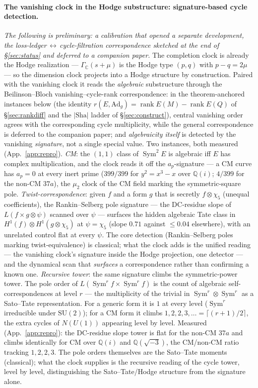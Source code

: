 \documentclass[11pt]{article}
\theoremstyle{definition}
\newcommand{\Sym}{\operatorname{Sym}}
\newcommand{\Sha}{\mathrm{Sha}}
\begin{document}
\paragraph{The vanishing clock in the Hodge substructure: signature-based cycle detection.}
\emph{The following is preliminary: a calibration that opened a separate development, the
loss-ledger$\,\leftrightarrow\,$cycle-filtration correspondence sketched at the end of \S\ref{sec:status}
and deferred to a companion paper.} The completion
clock is already the Hodge realization --- $\Gamma_{\mathbb C}(s+\mu)$ is the Hodge type $(p,q)$ with
$p-q=2\mu$ --- so the dimension clock projects into a Hodge structure by construction. Paired with the
vanishing clock it reads the \emph{algebraic} substructure through the Beilinson--Bloch
vanishing--cycle-rank correspondence: in the theorem-anchored instances below (the identity
$r(E,\mathrm{Ad}_g)=\operatorname{rank}E(M)-\operatorname{rank}E(Q)$ of \S\ref{sec:rankdiff} and the
$|\Sha|$ ladder of \S\ref{sec:construct}), central vanishing order agrees with the corresponding cycle
multiplicity, while the general correspondence is deferred to the companion paper; and
\emph{algebraicity itself} is detected by the vanishing \emph{signature}, not a single special value. Two
instances, both measured (App.~\ref{app:repro}). \emph{CM}: the $(1,1)$ class of $\Sym^2 E$ is algebraic
iff $E$ has complex multiplication, and the clock reads it off the $a_p$-signature --- a CM curve has
$a_p=0$ at every inert prime ($399/399$ for $y^2=x^3-x$ over $\mathbb Q(i)$; $4/399$ for the non-CM $37a$),
the $\mu_2$ clock of the CM field marking the symmetric-square pole. \emph{Twist-correspondence}: given $f$
and a form $g$ that is secretly $f\otimes\chi_5$ (unequal coefficients), the Rankin--Selberg pole signature
--- the DC-residue slope of $L(f\times g\otimes\psi)$ scanned over $\psi$ --- surfaces the hidden algebraic
Tate class in $H^1(f)\otimes H^1(g\otimes\chi_5)$ at $\psi=\chi_5$ (slope $0.71$ against $\le0.04$
elsewhere), with an unrelated control flat at every $\psi$. The core detection (Rankin--Selberg poles
marking twist-equivalence) is classical; what the clock adds is the unified reading --- the vanishing
clock's signature inside the Hodge projection, one detector --- and the dynamical scan that \emph{surfaces}
a correspondence rather than confirming a known one. \emph{Recursive tower}: the same signature climbs the
symmetric-power tower. The pole order of $L(\Sym^r f\times\Sym^r f)$ is the count of algebraic
self-correspondences at level $r$ --- the multiplicity of the trivial in $\Sym^r\otimes\Sym^r$ as a
Sato--Tate representation. For a generic form it is $1$ at every level ($\Sym^r$ irreducible under
$\mathrm{SU}(2)$); for a CM form it climbs $1,2,2,3,\dots=\lceil(r{+}1)/2\rceil$, the extra cycles of
$N(U(1))$ appearing level by level. Measured (App.~\ref{app:repro}): the DC-residue slope tower is flat for
the non-CM $37a$ and climbs identically for CM over $\mathbb Q(i)$ and $\mathbb Q(\sqrt{-3})$, the
CM/non-CM ratio tracking $1,2,2,3$. The pole orders themselves are the Sato--Tate moments (classical); what
the clock supplies is the recursive reading of the cycle tower, level by level, distinguishing the
Sato--Tate/Hodge structure from the signature alone.
\end{document}
